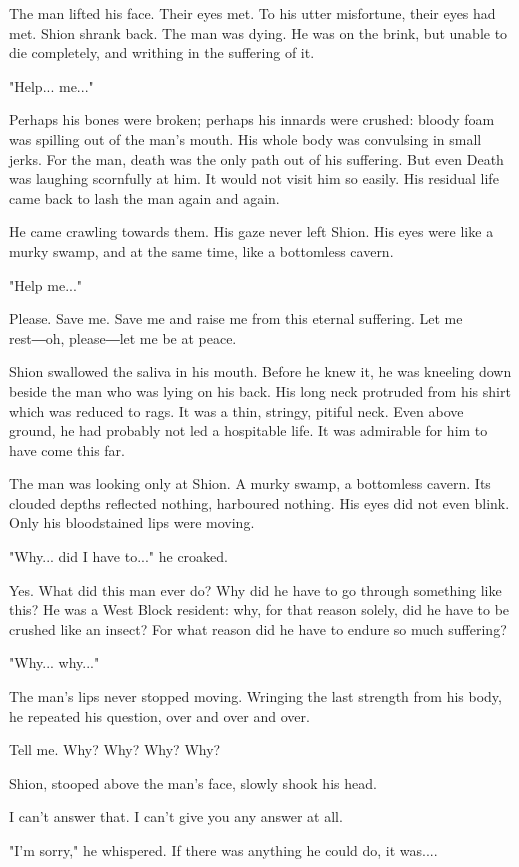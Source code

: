 The man lifted his face. Their eyes met. To his utter misfortune, their
eyes had met. Shion shrank back. The man was dying. He was on the brink,
but unable to die completely, and writhing in the suffering of it.

"Help... me..."

Perhaps his bones were broken; perhaps his innards were crushed: bloody
foam was spilling out of the man's mouth. His whole body was convulsing
in small jerks. For the man, death was the only path out of his
suffering. But even Death was laughing scornfully at him. It would not
visit him so easily. His residual life came back to lash the man again
and again.

He came crawling towards them. His gaze never left Shion. His eyes were
like a murky swamp, and at the same time, like a bottomless cavern.

"Help me..."

Please. Save me. Save me and raise me from this eternal suffering. Let
me rest―oh, please―let me be at peace.

Shion swallowed the saliva in his mouth. Before he knew it, he was
kneeling down beside the man who was lying on his back. His long neck
protruded from his shirt which was reduced to rags. It was a thin,
stringy, pitiful neck. Even above ground, he had probably not led a
hospitable life. It was admirable for him to have come this far.

The man was looking only at Shion. A murky swamp, a bottomless cavern.
Its clouded depths reflected nothing, harboured nothing. His eyes did
not even blink. Only his bloodstained lips were moving.

"Why... did I have to..." he croaked.

Yes. What did this man ever do? Why did he have to go through something
like this? He was a West Block resident: why, for that reason solely,
did he have to be crushed like an insect? For what reason did he have to
endure so much suffering?

"Why... why..."

The man's lips never stopped moving. Wringing the last strength from his
body, he repeated his question, over and over and over.

Tell me. Why? Why? Why? Why?

Shion, stooped above the man's face, slowly shook his head.

I can't answer that. I can't give you any answer at all.

"I'm sorry," he whispered. If there was anything he could do, it was....

